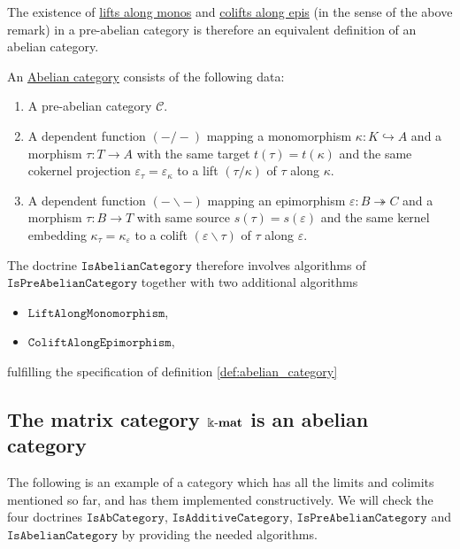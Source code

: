 The existence of \ul{lifts along monos} and \ul{colifts along epis} (in the sense of the above remark)
in a pre-abelian category is therefore an equivalent definition of an abelian category.

\begin{definition}\label{def:abelian_category}
An \ul{Abelian category} consists of the following data:
\begin{enumerate}
\renewcommand{\labelenumi}{(\theenumi)}
\item A pre-abelian category $\mathcal{C}$.
\item A dependent function $( - / - )$ mapping a monomorphism $\kappa : K \hookrightarrow A$ and a morphism $\tau : T \rightarrow A$ with
the same target $t(\tau) = t(\kappa)$ and the same cokernel projection $\varepsilon_{\tau} = \varepsilon_{\kappa}$ to a lift $(\tau / \kappa)$ of
$\tau$ along $\kappa$.
\item A dependent function $( - \backslash - )$ mapping an epimorphism $\varepsilon : B \twoheadrightarrow C$ and a morphism
$\tau : B \rightarrow T$ with same source $s(\tau) = s(\varepsilon)$ and the same kernel embedding $\kappa_{\tau} = \kappa_{\varepsilon}$
to a colift $(\varepsilon \backslash \tau)$ of $\tau$ along $\varepsilon$.
\end{enumerate}
\end{definition}

\begin{doctrine}
The doctrine $\mathtt{IsAbelianCategory}$ therefore involves algorithms of $\mathtt{IsPreAbelianCategory}$ together
with two additional algorithms
\begin{itemize}
\item $\mathtt{LiftAlongMonomorphism}$,
\item $\mathtt{ColiftAlongEpimorphism}$,
\end{itemize}
fulfilling the specification of definition \ref{def:abelian_category}
\end{doctrine}

\newpage
\subsection{The matrix category $\Bbbk\textnormal{-}\mathbf{mat}$ is an abelian category}

The following is an example of a category which has all the limits and colimits mentioned so far, and has them implemented constructively.
We will check the four doctrines $\mathtt{IsAbCategory}$, $\mathtt{IsAdditiveCategory}$, $\mathtt{IsPreAbelianCategory}$ and
$\mathtt{IsAbelianCategory}$ by providing the needed algorithms.

